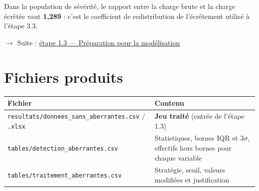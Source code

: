 \documentclass[

  french,

  10pt,

  a4paper,

]{article}
\newcounter{none} %
\begin{document}
Dans la population de sévérité, le rapport entre la charge brute et la charge écrêtée vaut \textbf{1,289} : c'est le coefficient de redistribution de l'écrêtement utilisé à l'étape 3.3.



\ensuremath{\rightarrow} Suite : \href{../1.3_preparation/README.pdf}{étape 1.3 --- Préparation pour la modélisation}



\section{Fichiers produits}



{\def\LTcaptype{none} %

\begin{longtable}[]{@{}

  >{\raggedright\arraybackslash}p{}

  >{\raggedright\arraybackslash}p{}@{}}

\toprule\noalign{}

\begin{minipage}[b]{\linewidth}\raggedright

Fichier

\end{minipage} & \begin{minipage}[b]{\linewidth}\raggedright

Contenu

\end{minipage} \\

\midrule\noalign{}

\endhead

\bottomrule\noalign{}

\endlastfoot

\texttt{resultats/donnees\_sans\_aberrantes.csv} / \texttt{.xlsx} & \textbf{Jeu traité} (entrée de l'étape 1.3) \\

\texttt{tables/detection\_aberrantes.csv} & Statistiques, bornes IQR et 3\ensuremath{\sigma}, effectifs hors bornes pour chaque variable \\

\texttt{tables/traitement\_aberrantes.csv} & Stratégie, seuil, valeurs modifiées et justification \\


\end{longtable}}
\end{document}
